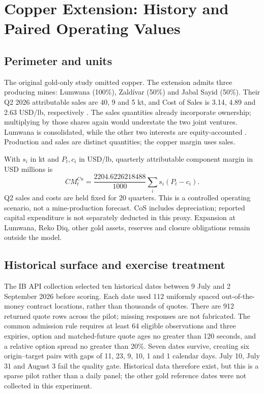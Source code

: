 \section{Copper Extension: History and Paired Operating Values}
\label{sec:copper-extension}

\subsection{Perimeter and units}
The original gold-only study omitted copper. The extension admits three producing mines: Lumwana (100\%), Zald\'ivar (50\%) and Jabal Sayid (50\%). Their Q2 2026 attributable sales are 40, 9 and 5 kt, and Cost of Sales is 3.14, 4.89 and 2.63 USD/lb, respectively \citep{barrickmine2026}. The sales quantities already incorporate ownership; multiplying by those shares again would understate the two joint ventures. Lumwana is consolidated, while the other two interests are equity-accounted \citep{barrickar2025}. Production and sales are distinct quantities; the copper margin uses sales.

With $s_i$ in kt and $P_t,c_i$ in USD/lb, quarterly attributable component margin in USD millions is
\begin{equation}
CM^{Cu}_t=\frac{2204.6226218488}{1000}\sum_i s_i(P_t-c_i).
\label{eq:copper-margin}
\end{equation}
Q2 sales and costs are held fixed for 20 quarters. This is a controlled operating scenario, not a mine-production forecast. CoS includes depreciation; reported capital expenditure is not separately deducted in this proxy. Expansion at Lumwana, Reko Diq, other gold assets, reserves and closure obligations remain outside the model.

\subsection{Historical surface and exercise treatment}
The IB API collection selected ten historical dates between 9 July and 2 September 2026 before scoring. Each date used 112 uniformly spaced out-of-the-money contract locations, rather than thousands of quotes. There are 912 returned quote rows across the pilot; missing responses are not fabricated. The common admission rule requires at least 64 eligible observations and three expiries, option and matched-future quote ages no greater than 120 seconds, and a relative option spread no greater than 20\%. Seven dates survive, creating six origin--target pairs with gaps of 11, 23, 9, 10, 1 and 1 calendar days. July 10, July 31 and August 3 fail the quality gate. Historical data therefore exist, but this is a sparse pilot rather than a daily panel; the other gold reference dates were not collected in this experiment.


